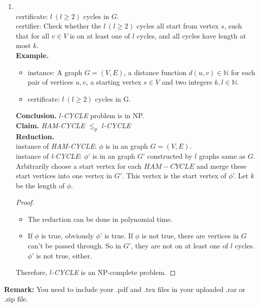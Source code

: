\documentclass[12pt,a4paper]{article}
\makeatletter
\newtheorem*{solution}{Solution}
\theoremstyle{definition}
\renewenvironment{solution}[1][Solution] {\par\pushQED{\qed}\normalfont\topsep6\p@\@plus6\p@\relax\trivlist\item[\hskip\labelsep\bfseries#1\@addpunct{.}]\ignorespaces}{\popQED\endtrivlist\@endpefalse} \makeatother
\makeatother
\begin{document}
\begin{enumerate}
    \begin{solution}
    	\quad \\
    	certificate: $l\ (l\ge 2)$ cycles in $G$. \\
    	certifier: Check whether the $l\ (l\ge 2)$ cycles all start from vertex $s$, such that for all $v\in V$ is on at least one of $l$ cycles, and all cycles have length at most $k$. \\
        \textbf{Example.}
        \begin{itemize}
        	\item instance: A graph $G = (V,E)$, a distance function $d(u,v)\in \mathbb{N}$ for each pair of vertices $u,v$, a starting vertex $s\in V$ and two integers $k, l \in \mathbb{N}$. 
        	\item certificate: $l\ (l\ge 2)$ cycles in G.
        \end{itemize}
    	\textbf{Conclusion.} \textit{$l$-CYCLE} problem is in NP. \\
    	\textbf{Claim.} \textit{HAM-CYCLE} $\leq_p$ \textit{$l$-CYCLE} \\
    	\textbf{Reduction.} \\ 
    	instance of \textit{HAM-CYCLE}: $\phi$ is in an graph $G = (V,E)$. \\    	
    	instance of \textit{l-CYCLE}: $\phi$' is in an graph $G$' constructed by $l$ graphs same as $G$. Arbitrarily choose a start vertex for each $HAM-CYCLE$ and merge these start vertices into one vertex in $G'$. This vertex is the start vertex of $\phi$'. Let $k$ be the length of $\phi$.
    	\begin{proof}
    	\begin{itemize}
    		\item The reduction can be done in polynomial time. 
    		\item If $\phi$ is true, obviously $\phi$' is true. If $\phi$ is not true, there are vertices in $G$ can't be passed through. So in $G$', they are not on at least one of $l$ cycles. $\phi$' is not true, either. 
    	\end{itemize}
    	Therefore, \textit{$l$-CYCLE} is an NP-complete problem. 
    	\end{proof}
    	
    \end{solution}	
	
\end{enumerate}

\vspace{20pt}

\textbf{Remark:} You need to include your .pdf and .tex files in your uploaded .rar or .zip file.

\end{document}
